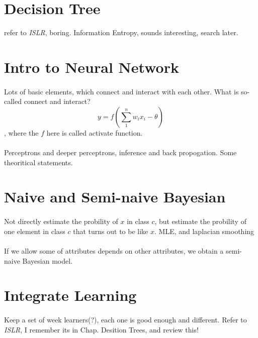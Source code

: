 \documentclass{article}
\begin{document}
\section{Decision Tree}
  refer to \textit{ISLR}, boring. Information Entropy, sounds interesting, search later.

\section{Intro to Neural Network}
  \paragraph{} Lots of basic elements, which connect and interact with each other. What is so-called connect and interact?
  \begin{equation}
    y = f(\sum_{1}^{n}w_{i}x_{i} - \theta)
  \end{equation}
  , where the $f$ here is called activate function.
  \paragraph{} Perceptrons and deeper perceptrons, inference and back propogation. Some theoritical statements.

\section{Naive and Semi-naive Bayesian}
  \paragraph{} Not directly estimate the probility of $x$ in class $c$, but estimate the probility of one element in class $c$ that turns out to be like $x$. MLE, and laplacian smoothing
  \paragraph{} If we allow some of attributes depends on other attributes, we obtain a semi-naive Bayesian model.

\section{Integrate Learning}
  \paragraph{} Keep a set of week learners(?), each one is good enough and different. Refer to \textit{ISLR}, I remember its in Chap. Desition Trees, and review this!
\end{document}
